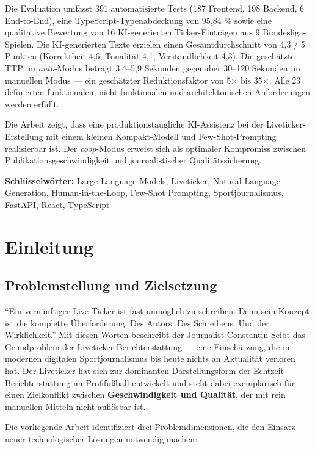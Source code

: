 \documentclass[12pt,a4paper,notitlepage,ngerman]{report}
\begin{document}
Die Evaluation umfasst 391 automatisierte Tests (187 Frontend, 198 Backend, 6 End-to-End), eine TypeScript-Typenabdeckung von 95,84 \% sowie eine qualitative Bewertung von 16 KI-generierten Ticker-Einträgen aus 9 Bundesliga-Spielen. Die KI-generierten Texte erzielen einen Gesamtdurchschnitt von 4,3 / 5 Punkten (Korrektheit 4,6, Tonalität 4,1, Verständlichkeit 4,3). Die geschätzte TTP im \textit{auto}-Modus beträgt 3,4–5,9 Sekunden gegenüber 30–120 Sekunden im manuellen Modus — ein geschätzter Reduktionsfaktor von 5× bis 35×. Alle 23 definierten funktionalen, nicht-funktionalen und architektonischen Anforderungen werden erfüllt.

Die Arbeit zeigt, dass eine produktionstaugliche KI-Assistenz bei der Liveticker-Erstellung mit einem kleinen Kompakt-Modell und Few-Shot-Prompting realisierbar ist. Der \textit{coop}-Modus erweist sich als optimaler Kompromiss zwischen Publikationsgeschwindigkeit und journalistischer Qualitätssicherung.

\noindent\textbf{Schlüsselwörter:} Large Language Models, Liveticker, Natural Language Generation, Human-in-the-Loop, Few-Shot Prompting, Sportjournalismus, FastAPI, React, TypeScript

\tableofcontents

\chapter{Einleitung}

\section{Problemstellung und Zielsetzung}

``Ein vernünftiger Live-Ticker ist fast unmöglich zu schreiben. Denn sein Konzept ist die komplette Überforderung. Des Autors. Des Schreibens. Und der Wirklichkeit.'' Mit diesen Worten beschreibt der Journalist Constantin Seibt das Grundproblem der Liveticker-Berichterstattung — eine Einschätzung, die im modernen digitalen Sportjournalismus bis heute nichts an Aktualität verloren hat. Der Liveticker hat sich zur dominanten Darstellungsform der Echtzeit-Berichterstattung im Profifußball entwickelt und steht dabei exemplarisch für einen Zielkonflikt zwischen \textbf{Geschwindigkeit und Qualität}, der mit rein manuellen Mitteln nicht auflösbar ist.

Die vorliegende Arbeit identifiziert drei Problemdimensionen, die den Einsatz neuer technologischer Lösungen notwendig machen:
\end{document}
